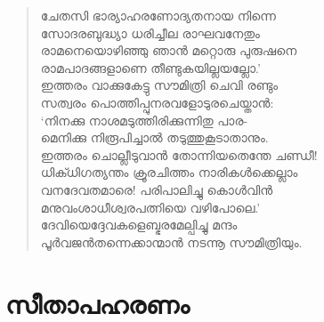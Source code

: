 \begin{verse}
ചേതസി ഭാര്യാഹരണോദ്യതനായ നിന്നെ\\
സോദരബുദ്ധ്യാ ധരിച്ചീല രാഘവനേതും\\
രാമനെയൊഴിഞ്ഞു ഞാന്‍ മറ്റൊരു പുരുഷനെ\\
രാമപാദങ്ങളാണെ തീണ്ടുകയില്ലയല്ലോ.’\\
ഇത്തരം വാക്കുകേട്ടു സൗമിത്രി ചെവി രണ്ടും\\
സത്വരം പൊത്തിപ്പുനരവളോടുരചെയ്താന്‍:\\
‘നിനക്കു നാശമടുത്തിരിക്കുന്നിതു പാര-\\
മെനിക്കു നിരൂപിച്ചാല്‍ തടുത്തുകൂടാതാനും.\\
ഇത്തരം ചൊല്ലീടുവാന്‍ തോന്നിയതെന്തേ ചണ്ഡീ!\\
ധിക്ധിഗത്യന്തം ക്രൂരചിത്തം നാരികള്‍ക്കെല്ലാം\\
വനദേവതമാരെ! പരിപാലിച്ചു കൊള്‍വിന്‍\\
മനുവംശാധീശ്വരപത്നിയെ വഴിപോലെ.’\\
ദേവിയെദ്ദേവകളെബ്ഭരമേല്പിച്ചു മന്ദം\\
പൂര്‍വജന്‍തന്നെക്കാന്മാന്‍ നടന്നൂ സൗമിത്രിയും.
\end{verse}

\section{സീതാപഹരണം}

